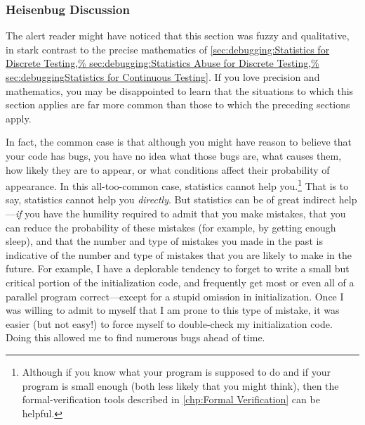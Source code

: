 \subsubsection{Heisenbug Discussion}
\label{sec:debugging:Heisenbug Discussion}

The alert reader might have noticed that this section was fuzzy and
qualitative, in stark contrast to the precise mathematics of
\cref{sec:debugging:Statistics for Discrete Testing,%
sec:debugging:Statistics Abuse for Discrete Testing,%
sec:debuggingStatistics for Continuous Testing}.
If you love precision and mathematics, you may be disappointed to
learn that the situations to which this section applies are far
more common than those to which the preceding sections apply.

In fact, the common case is that although you might have reason to believe
that your code has bugs, you have no idea what those bugs are, what
causes them, how likely they are to appear, or what conditions affect
their probability of appearance.
In this all-too-common case, statistics cannot help you.\footnote{
	Although if you know what your program is supposed to do and
	if your program is small enough (both less likely that you
	might think), then the formal-verification tools described in
	\cref{chp:Formal Verification}
	can be helpful.}
That is to say, statistics cannot help you \emph{directly}.
But statistics can be of great indirect help---\emph{if} you have the
humility required to admit that you make mistakes, that you can reduce the
probability of these mistakes (for example, by getting enough sleep), and
that the number and type of mistakes you made in the past is indicative of
the number and type of mistakes that you are likely to make in the future.
For example, I have a deplorable tendency to forget to write a small
but critical portion of the initialization code, and frequently get most
or even all of a parallel program correct---except for a stupid
omission in initialization.
Once I was willing to admit to myself that I am prone to this type of
mistake, it was easier (but not easy!\@) to force myself to double-check
my initialization code.
Doing this allowed me to find numerous bugs ahead of time.

